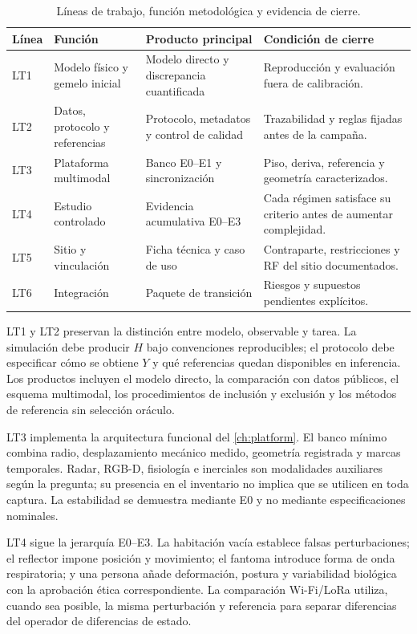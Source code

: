 \begin{table}[htbp]
\centering\small
\caption{Líneas de trabajo, función metodológica y evidencia de cierre.}
\label{tab:wbs_stage1_summary}
\begin{tabularx}{\textwidth}{P{1.0cm}P{3.0cm}L L}
\toprule
Línea & Función & Producto principal & Condición de cierre\\
\midrule
LT1 & Modelo físico y gemelo inicial & Modelo directo y discrepancia cuantificada &
Reproducción y evaluación fuera de calibración.\\
LT2 & Datos, protocolo y referencias & Protocolo, metadatos y control de calidad &
Trazabilidad y reglas fijadas antes de la campaña.\\
LT3 & Plataforma multimodal & Banco E0--E1 y sincronización & Piso, deriva,
referencia y geometría caracterizados.\\
LT4 & Estudio controlado & Evidencia acumulativa E0--E3 & Cada régimen satisface
su criterio antes de aumentar complejidad.\\
LT5 & Sitio y vinculación & Ficha técnica y caso de uso & Contraparte,
restricciones y RF del sitio documentados.\\
LT6 & Integración & Paquete de transición & Riesgos y supuestos pendientes
explícitos.\\
\bottomrule
\end{tabularx}
\end{table}

LT1 y LT2 preservan la distinción entre modelo, observable y tarea. La simulación
debe producir $H$ bajo convenciones reproducibles; el protocolo debe especificar
cómo se obtiene $Y$ y qué referencias quedan disponibles en inferencia. Los productos
incluyen el modelo directo, la comparación con datos públicos, el esquema multimodal,
los procedimientos de inclusión y exclusión y los métodos de referencia sin selección
oráculo.

LT3 implementa la arquitectura funcional del \cref{ch:platform}. El banco mínimo
combina radio, desplazamiento mecánico medido, geometría registrada y marcas
temporales. Radar, RGB-D, fisiología e inerciales son modalidades auxiliares según
la pregunta; su presencia en el inventario no implica que se utilicen en toda captura.
La estabilidad se demuestra mediante E0 y no mediante especificaciones nominales.

LT4 sigue la jerarquía E0--E3. La habitación vacía establece falsas perturbaciones;
el reflector impone posición y movimiento; el fantoma introduce forma de onda
respiratoria; y una persona añade deformación, postura y variabilidad biológica con
la aprobación ética correspondiente. La comparación Wi-Fi/LoRa utiliza, cuando sea
posible, la misma perturbación y referencia para separar diferencias del operador
de diferencias de estado.

